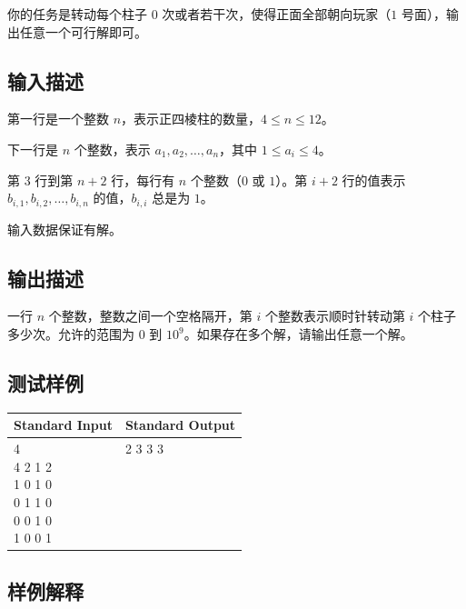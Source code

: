 你的任务是转动每个柱子 $0$ 次或者若干次，使得正面全部朝向玩家（$1$ 号面），输出任意一个可行解即可。

\subsection*{输入描述}

第一行是一个整数 $n$，表示正四棱柱的数量，$4 \leq n \leq 12$。

下一行是 $n$ 个整数，表示 $a_1, a_2, \dots, a_n$，其中 $1 \leq a_i \leq 4$。

第 $3$ 行到第 $n+2$ 行，每行有 $n$ 个整数（$0$ 或 $1$）。第 $i+2$ 行的值表示 $b_{i,1}, b_{i,2}, \dots, b_{i,n}$ 的值，$b_{i,i}$ 总是为 $1$。

输入数据保证有解。

\subsection*{输出描述}

一行 $n$ 个整数，整数之间一个空格隔开，第 $i$ 个整数表示顺时针转动第 $i$ 个柱子多少次。允许的范围为 $0$ 到 $10^9$。如果存在多个解，请输出任意一个解。

\subsection*{测试样例}

\begin{table}[H]
\begin{tabularx}{\textwidth}{|X|X|}
    \hline
    \textbf{Standard Input} & \textbf{Standard Output} \\ 
    \hline
    \tablecell{
        4 \\
        4 2 1 2 \\
        1 0 1 0 \\
        0 1 1 0 \\
        0 0 1 0 \\
        1 0 0 1 \\
    } & \tablecell{
        2 3 3 3 \\ \\ \\ \\ \\ \\
    } \\
    \hline
\end{tabularx}
\end{table}

\subsection*{样例解释}

